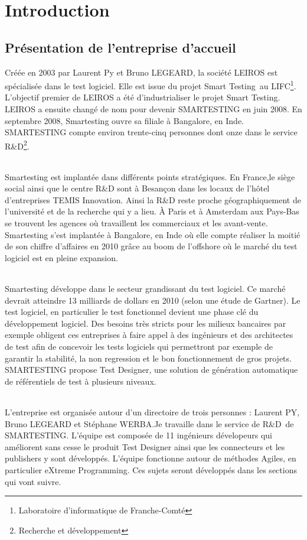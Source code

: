 \chapter{Introduction}

\section{Présentation de l'entreprise d'accueil}
Créée en 2003 par Laurent Py et Bruno LEGEARD, la société LEIROS est spécialisée dans le test logiciel. Elle est issue du projet Smart Testing\texttrademark ~au LIFC\footnote{Laboratoire d'informatique de Franche-Comté}. L'objectif premier de LEIROS a été d'industrialiser le projet Smart Testing\texttrademark.  LEIROS a ensuite changé de nom pour devenir SMARTESTING en juin 2008. En septembre 2008, Smartesting ouvre sa filiale à Bangalore, en Inde. SMARTESTING compte environ trente-cinq personnes dont onze dans le service R\&D{}\footnote{Recherche et développement}.

\subparagraph*{}
Smartesting est implantée dans différents points stratégiques. En France,le siège social ainsi que le centre R\&D sont à Besançon dans les locaux de l'hôtel d'entreprises TEMIS Innovation. Ainsi la R\&D reste proche géographiquement de l'université et de la recherche qui y a lieu. À Paris et à Amsterdam aux Pays-Bas se trouvent les agences où travaillent les commerciaux et les avant-vente. Smartesting s'est implantée à Bangalore, en Inde où elle compte réaliser la moitié de son chiffre d'affaires en 2010 grâce au boom de l'offshore où le marché du test logiciel est en pleine expansion.


\subparagraph*{}
Smartesting développe dans le secteur grandissant du test logiciel. Ce marché devrait atteindre 13 milliards de dollars en 2010 (selon une étude de Gartner). Le test logiciel, en particulier le test fonctionnel devient une phase clé du développement logiciel. Des besoins très stricts pour les milieux bancaires par exemple obligent ces entreprises à faire appel à des ingénieurs et des architectes de test afin de concevoir les tests logiciels qui permettront par exemple de garantir la stabilité, la non regression et le bon fonctionnement de gros projets. SMARTESTING propose Test Designer, une solution de génération automatique de référentiels de test à plusieurs niveaux.

\subparagraph*{}
L'entreprise est organisée autour d'un directoire de trois personnes : Laurent PY, Bruno LEGEARD et Stéphane WERBA.Je travaille dans le service de R\&D{}\ de SMARTESTING.  L'équipe est composée de 11 ingénieurs dévelopeurs qui améliorent sans cesse le produit Test Designer ainsi que les connecteurs et les publishers y sont développés. L'équipe fonctionne autour de méthodes Agiles, en particulier eXtreme Programming. Ces sujets seront développés dans les sections qui vont suivre.

